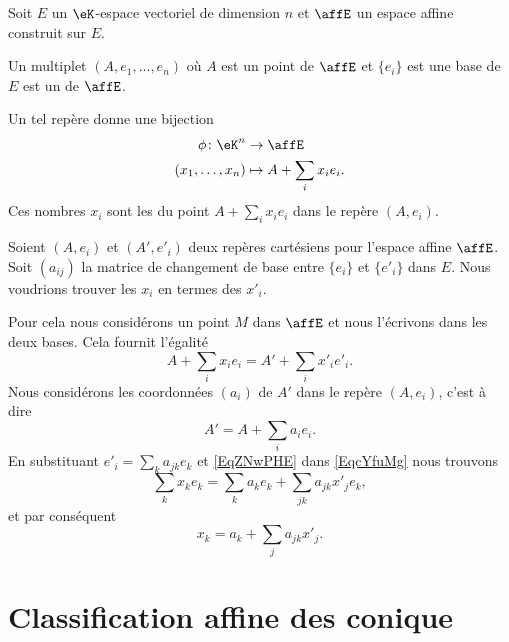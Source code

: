 Soit \( E\) un \( \eK\)-espace vectoriel de dimension \( n\) et \( \affE\) un espace affine construit sur \( E\).
\begin{definition}
    Un multiplet \( (A,e_1,\ldots, e_n)\) où \( A\) est un point de \( \affE\) et \( \{ e_i \}\) est une base de \( E\) est un  de \( \affE\).
\end{definition}
Un tel repère donne une bijection
\begin{equation}
    \begin{aligned}
        \phi\colon \eK^n&\to \affE \\
        (x_1,\ldots, x_n)&\mapsto A+\sum_ix_ie_i. 
    \end{aligned}
\end{equation}
Ces nombres \( x_i\) sont les  du point \( A+\sum_ix_ie_i\) dans le repère \( (A,e_i)\).

Soient \( (A,e_i)\) et \( (A',e'_i)\) deux repères cartésiens pour l'espace affine \( \affE\). Soit \( (a_{ij})\) la matrice de changement de base entre \( \{ e_i \}\) et \( \{ e'_i \}\) dans \( E\). Nous voudrions trouver les \( x_i\) en termes des \( x'_i\).

Pour cela nous considérons un point \( M\) dans \( \affE\) et nous l'écrivons dans les deux bases. Cela fournit l'égalité
\begin{equation}        \label{EqcYfuMg}
    A+\sum_ix_ie_i=A'+\sum_ix'_ie'_i.
\end{equation}
Nous considérons les coordonnées \( (a_i)\) de \( A'\) dans le repère \( (A,e_i)\), c'est à dire
\begin{equation}    \label{EqZNwPHE}
    A'=A+\sum_ia_ie_i.
\end{equation}
En substituant \( e'_i=\sum_ka_{jk}e_k\) et \eqref{EqZNwPHE} dans \eqref{EqcYfuMg} nous trouvons
\begin{equation}
    \sum_kx_ke_k=\sum_ka_ke_k+\sum_{jk}a_{jk}x'_je_k,
\end{equation}
et par conséquent
\begin{equation}
    x_k=a_k+\sum_ja_{jk}x'_j.
\end{equation}

\section{Classification affine des conique}

